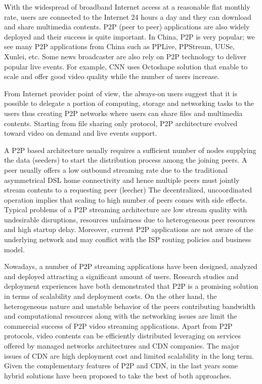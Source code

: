 \documentclass[paper]{ieice}
\begin{document}
With the widespread of broadband Internet access at a reasonable flat monthly rate, users are connected to the Internet 24 hours a day and they can download and share multimedia contents.
P2P (peer to peer) applications are also widely deployed and their success is quite important.
In China, P2P is very popular; 
we see many P2P applications from China such as PPLive, PPStream, UUSe, Xunlei, etc.  
Some news broadcaster are also rely on P2P technology to deliver popular live events.
For example, CNN uses Octoshape solution that enable to scale and offer good video quality while the number of users increase.

From Internet provider point of view, the always-on users suggest that it is possible to delegate a portion of computing, storage and networking tasks to the users thus creating P2P networks where users can share files and multimedia contents.
Starting from file sharing only protocol, P2P architecture evolved toward video on demand and live events support. 

A P2P based architecture usually requires a sufficient number of nodes supplying the data (seeders) to start the distribution process among the joining peers.
A peer usually offers a low outbound streaming rate due to the traditional asymmetrical DSL home connectivity and hence multiple peers must jointly stream contents to a requesting peer (leecher) 
The decentralized, uncoordinated operation implies that scaling to high number of peers comes with side effects.
Typical problems of a P2P streaming architecture are low stream quality with undesirable disruptions, resources unfairness due to heterogeneous peer resources and high startup delay.
Moreover, current P2P applications are not aware of the underlying network and may conflict with the ISP routing policies and business model.

Nowadays, a number of P2P streaming applications have been designed, analyzed and deployed attracting a significant amount of users.
Research studies and deployment experiences have both demonstrated that P2P is a promising solution in terms of scalability and deployment costs.
On the other hand, the heterogeneous nature and unstable behavior of the peers contributing bandwidth and computational resources along with the networking issues are limit the commercial success of P2P video streaming applications.
Apart from P2P protocols, video contents can be efficiently distributed leveraging on services offered by managed networks architectures and CDN companies.
The major issues of CDN are high deployment cost and limited scalability in the long term.
Given the complementary features of P2P and CDN, in the last years some hybrid solutions have been proposed \cite{Huang:2008:UHC:1496046.1496064,4772628,Yin:2009:DDH:1631272.1631279} to take the best of both approaches.
\end{document}
